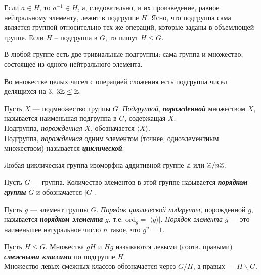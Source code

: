 \documentclass{article}
\begin{document}
\begin{example}
	Если $a \in H$, то $a^{-1} \in H$, а, следовательно, и их произведение, равное нейтральному элементу, лежит в подгруппе $H$. Ясно, что подгруппа сама является группой относительно тех же операций, которые заданы в объемлющей группе. Если $H$ – подгруппа в $G$, то пишут $H \leq G$. 
\end{example}

\begin{example}
	В любой группе есть две тривиальные подгруппы: сама группа и множество, состоящее из одного нейтрального элемента.
\end{example}

\begin{example}
	Во множестве целых чисел с операцией сложения есть подгруппа чисел делящихся на 3. $3\mathbb{Z} \leq \mathbb{Z}$. 
\end{example}


\begin{definition_boxed}
	Пусть $X$ — подмножество группы $G$. \textit{Подгруппой}, \textbf{\textit{порожденной}} множеством $X$, называется наименьшая подгруппа в $G$, содержащая $X$.\\
	Подгруппа, \textit{порожденная} $X$, обозначается $\langle X \rangle$.\\
	Подгруппа, \textit{порожденная} одним элементом (точнее, одноэлементным множеством) называется \textbf{\textit{циклической}}.
\end{definition_boxed}

\begin{theorem_boxed}
	Любая циклическая группа изоморфна аддитивной группе $\mathbb{Z}$ или $\mathbb{Z}/n\mathbb{Z}$.
\end{theorem_boxed}

\begin{definition_boxed}
	Пусть $G$ — группа. Количество элементов в этой группе называется \textbf{\textit{порядком группы}} $G$ и обозначается $|G|.$
\end{definition_boxed}

\begin{definition_boxed}
	Пусть $g$ — элемент группы $G$. \textit{Порядок циклической подгруппы,} порожденной $g$, называется \textbf{\textit{порядком элемента}} $g$, т.е. $\text{ord}_g = |\langle g \rangle|$. 
	\textit{Порядок элемента} $g$ — это наименьшее натуральное число $n$ такое, что $g^n = 1$.
\end{definition_boxed}

\begin{definition_boxed}
Пусть $H \leq G$. Множества $gH$ и $Hg$ называются левыми (соотв. правыми) \textbf{\textit{смежными классами}} по подгруппе $H$.\\
Множество левых смежных классов обозначается через $G/H$, а правых — $H \backslash G$.
\end{definition_boxed}
\end{document}

